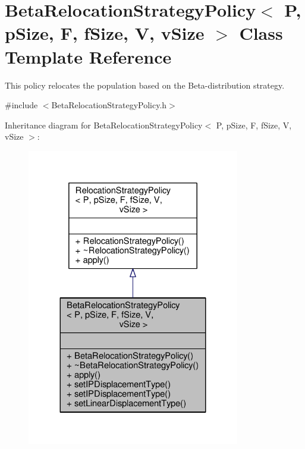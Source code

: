 \hypertarget{classBetaRelocationStrategyPolicy}{}\section{Beta\+Relocation\+Strategy\+Policy$<$ P, p\+Size, F, f\+Size, V, v\+Size $>$ Class Template Reference}
\label{classBetaRelocationStrategyPolicy}


This policy relocates the population based on the Beta-\/distribution strategy.  




{\ttfamily \#include $<$Beta\+Relocation\+Strategy\+Policy.\+h$>$}



Inheritance diagram for Beta\+Relocation\+Strategy\+Policy$<$ P, p\+Size, F, f\+Size, V, v\+Size $>$\+:\nopagebreak
\begin{figure}[H]
\begin{center}
\leavevmode
\includegraphics[width=263pt]{classBetaRelocationStrategyPolicy__inherit__graph}
\end{center}
\end{figure}


